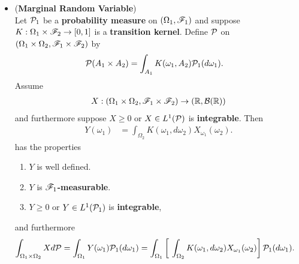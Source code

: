 \documentclass[11pt]{article}
\begin{document}
\begin{itemize}
\item \begin{proposition} (\textbf{Marginal Random Variable}) \citep{resnick2013probability}\\
Let ${\mathcal P}_1$ be a \textbf{probability measure} on $(\Omega_1, {\mathscr F}_1)$ and suppose $K: \Omega_1 \times {\mathscr F}_2 \rightarrow [0,1]$ is a \textbf{transition kernel}. Define ${\mathcal P}$ on $(\Omega_{1}\times \Omega_{2}, {\mathscr F}_{1}\times {\mathscr F}_{2})$ by
\begin{align*}
{\mathcal P}(A_{1}\times A_{2}) &= \int_{A_{1}}K(\omega_{1}, A_{2}){\mathcal P}_{1}(d\omega_{1}).
\end{align*}
Assume
\begin{align*}
X: (\Omega_{1}\times \Omega_{2}, {\mathscr F}_{1}\times {\mathscr F}_{2}) \rightarrow ({\mathbb R}, {\mathcal B}({\mathbb R}))
\end{align*}
and furthermore suppose $X \ge 0$ or $X \in L^1({\mathcal P})$ is \textbf{integrable}. Then
\begin{align*}
Y(\omega_1) &= \int_{\Omega_2}K(\omega_{1}, d\omega_2)X_{\omega_1}(\omega_{2}).
\end{align*}
has the properties
\begin{enumerate}
\item $Y$ is well defined.
\item $Y$ is \textbf{${\mathscr F}_1$-measurable}.
\item $Y \ge 0$ or $Y \in L^1({\mathcal P}_1)$ is \textbf{integrable},
\end{enumerate} and furthermore
\begin{align*}
\int_{\Omega_1 \times \Omega_2} X d\cP &= \int_{\Omega_1} Y(\omega_1)\cP_1(d\omega_1) = \int_{\Omega_1} \brac{\ \int_{\Omega_2}K(\omega_{1}, d\omega_2)X_{\omega_1}(\omega_{2})}\cP_1(d\omega_1).
\end{align*}
\end{proposition}


\end{itemize}
\end{document}
